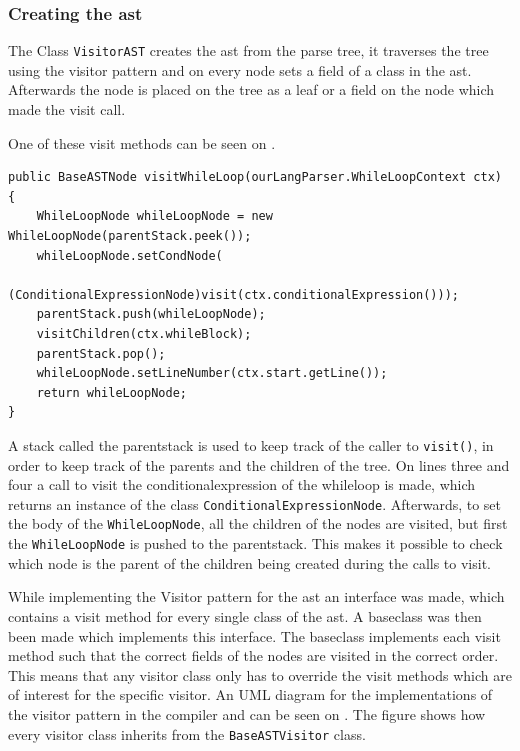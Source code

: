 \subsubsection*{Creating the \acrshort{ast}}

The Class \texttt{VisitorAST} creates the \acrshort{ast} from the parse tree, it traverses the tree using the visitor pattern and on every node sets a field of a class in the \acrshort{ast}. 
Afterwards the node is placed on the tree as a leaf or a field on the node which made the visit call.

One of these visit methods can be seen on .

\begin{lstlisting}[caption=The Visit Method for WhileLoopNode,frame=tlrb,label={lst:VisitorASTCode}]
public BaseASTNode visitWhileLoop(ourLangParser.WhileLoopContext ctx) {
    WhileLoopNode whileLoopNode = new WhileLoopNode(parentStack.peek());
    whileLoopNode.setCondNode(
    	(ConditionalExpressionNode)visit(ctx.conditionalExpression()));
    parentStack.push(whileLoopNode);
    visitChildren(ctx.whileBlock);
    parentStack.pop();
    whileLoopNode.setLineNumber(ctx.start.getLine());
    return whileLoopNode;
}
\end{lstlisting}
A stack called the parentstack is used to keep track of the caller to \texttt{visit()}, in order to keep track of the parents and the children of the tree.
On lines three and four a call to visit the conditionalexpression of the whileloop is made, which returns an instance of the class \texttt{ConditionalExpressionNode}.
Afterwards, to set the body of the \texttt{WhileLoopNode}, all the children of the nodes are visited, but first the \texttt{WhileLoopNode} is pushed to the parentstack.
This makes it possible to check which node is the parent of the children being created during the calls to visit.

While implementing the Visitor pattern for the \acrshort{ast} an interface was made, which contains a visit method for every single class of the \acrshort{ast}.
A baseclass was then been made which implements this interface.
The baseclass implements each visit method such that the correct fields of the nodes are visited in the correct order.
This means that any visitor class only has to override the visit methods which are of interest for the specific visitor.
An UML diagram for the implementations of the visitor pattern in the compiler and can be seen on .
The figure shows how every visitor class inherits from the \texttt{BaseASTVisitor} class.

